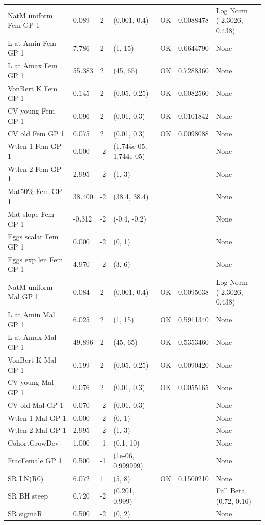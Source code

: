 \documentclass[
  english,
  a4paper,
]{article}
\begin{document}
\begin{landscape}
\begin{longtable}[t]{>{\raggedright\arraybackslash}p{8.5cm}lllll>{\raggedright\arraybackslash}p{4cm}}
\endfoot
\bottomrule
\endlastfoot
NatM uniform Fem GP 1 & 0.089 & 2 & (0.001, 0.4) & OK & 0.0088478 & Log Norm (-2.3026, 0.438)\\
L at Amin Fem GP 1 & 7.786 & 2 & (1, 15) & OK & 0.6644790 & None\\
L at Amax Fem GP 1 & 55.383 & 2 & (45, 65) & OK & 0.7288360 & None\\
VonBert K Fem GP 1 & 0.145 & 2 & (0.05, 0.25) & OK & 0.0082560 & None\\
CV young Fem GP 1 & 0.096 & 2 & (0.01, 0.3) & OK & 0.0101842 & None\\
CV old Fem GP 1 & 0.075 & 2 & (0.01, 0.3) & OK & 0.0098088 & None\\
Wtlen 1 Fem GP 1 & 0.000 & -2 & (1.744e-05, 1.744e-05) &  &  & None\\
Wtlen 2 Fem GP 1 & 2.995 & -2 & (1, 3) &  &  & None\\
Mat50\% Fem GP 1 & 38.400 & -2 & (38.4, 38.4) &  &  & None\\
Mat slope Fem GP 1 & -0.312 & -2 & (-0.4, -0.2) &  &  & None\\
Eggs scalar Fem GP 1 & 0.000 & -2 & (0, 1) &  &  & None\\
Eggs exp len Fem GP 1 & 4.970 & -2 & (3, 6) &  &  & None\\
NatM uniform Mal GP 1 & 0.084 & 2 & (0.001, 0.4) & OK & 0.0095038 & Log Norm (-2.3026, 0.438)\\
L at Amin Mal GP 1 & 6.025 & 2 & (1, 15) & OK & 0.5911340 & None\\
L at Amax Mal GP 1 & 49.896 & 2 & (45, 65) & OK & 0.5353460 & None\\
VonBert K Mal GP 1 & 0.199 & 2 & (0.05, 0.25) & OK & 0.0090420 & None\\
CV young Mal GP 1 & 0.076 & 2 & (0.01, 0.3) & OK & 0.0055165 & None\\
CV old Mal GP 1 & 0.070 & -2 & (0.01, 0.3) &  &  & None\\
Wtlen 1 Mal GP 1 & 0.000 & -2 & (0, 1) &  &  & None\\
Wtlen 2 Mal GP 1 & 2.995 & -2 & (1, 3) &  &  & None\\
CohortGrowDev & 1.000 & -1 & (0.1, 10) &  &  & None\\
FracFemale GP 1 & 0.500 & -1 & (1e-06, 0.999999) &  &  & None\\
SR LN(R0) & 6.072 & 1 & (5, 8) & OK & 0.1500210 & None\\
SR BH steep & 0.720 & -2 & (0.201, 0.999) &  &  & Full Beta (0.72, 0.16)\\
SR sigmaR & 0.500 & -2 & (0, 2) &  &  & None\\

\end{longtable}
\end{landscape}
\end{document}
